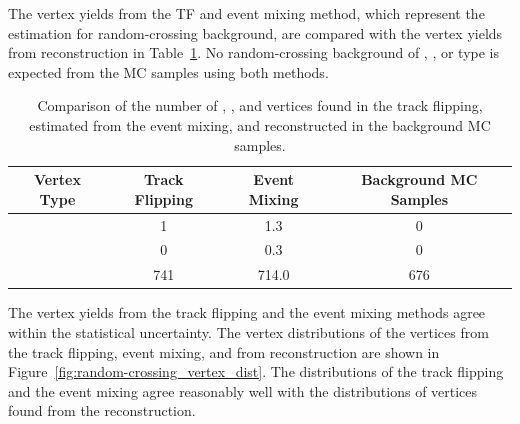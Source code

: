 The vertex yields from the TF and event mixing method, which represent the estimation for random-crossing background, are compared with the vertex yields from reconstruction in Table~\ref{table:random_vertex_count}. No random-crossing background of \mumu, \ee, or \emu type is expected from the MC samples using both methods. 
 
\begin{table}[!htb]
  \centering
  \begin{tabular}{ c  c c c }
    \hline
    \hline
	Vertex Type					& Track Flipping	        & Event Mixing	        & Background MC Samples \\
    \hline
	\mux						&	1						&	1.3 				&	0					\\
	\ex						    &	0						&	0.3 				&	0					\\
	\xx						    &	741 					&	714.0				&	676 				\\
    \hline
    \hline
  \end{tabular}
  \caption{Comparison of the number of \mux, \ex, and \xx vertices found in the track flipping, estimated from the event mixing, and reconstructed in the background MC samples.}
  \label{table:random_vertex_count}
\end{table}

The \xx vertex yields from the track flipping and the event mixing methods agree within the statistical uncertainty. The \xx vertex distributions of the vertices from the track flipping, event mixing, and from reconstruction are shown in Figure~\ref{fig:random-crossing_vertex_dist}. The distributions of the track flipping and the event mixing agree reasonably well with the distributions of vertices found from the reconstruction.

